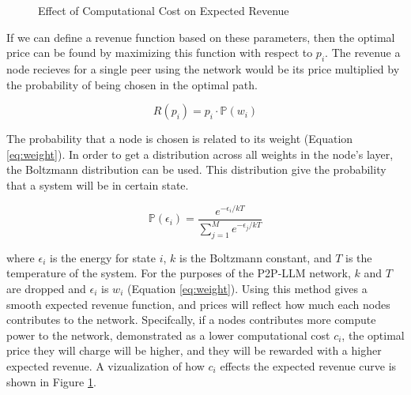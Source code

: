 \documentclass[preprint,twoside,11pt]{article}
\begin{document}
\begin{figure}
	\centering
	\caption{Effect of Computational Cost on Expected Revenue}
	\label{fig:exp_rev}
\end{figure}

If we can define a revenue function based on these parameters, then the optimal price can be found by maximizing this function with respect to $p_i$.
The revenue a node recieves for a single peer using the network would be its price multiplied by the probability of being chosen in the optimal path.

\begin{equation}
	R(p_i) = p_i \cdot \mathbb{P}(w_i)
	\label{eq:revenue}
\end{equation}

The probability that a node is chosen is related to its weight (Equation \ref{eq:weight}).
In order to get a distribution across all weights in the node's layer, the Boltzmann distribution \citep{boltzmann1868studien} can be used.
This distribution give the probability that a system will be in certain state.

\begin{equation}
	\mathbb{P}(\epsilon_i) = \frac{e^{- \epsilon_i / kT}}{\sum_{j=1}^{M}e^{- \epsilon_j / kT}}
	\label{eq:Boltzmann}
\end{equation}

where $\epsilon_i$ is the energy for state $i$, $k$ is the Boltzmann constant, and $T$ is the temperature of the system.
For the purposes of the P2P-LLM network, $k$ and $T$ are dropped and $\epsilon_i$ is $w_i$ (Equation \ref{eq:weight}).
Using this method gives a smooth expected revenue function, and prices will reflect how much each nodes contributes to the network.
Specifcally, if a nodes contributes more compute power to the network, demonstrated as a lower computational cost $c_i$, the optimal
price they will charge will be higher, and they will be rewarded with a higher expected revenue.
A vizualization of how $c_i$ effects the expected revenue curve is shown in Figure \ref{fig:exp_rev}.
\end{document}
